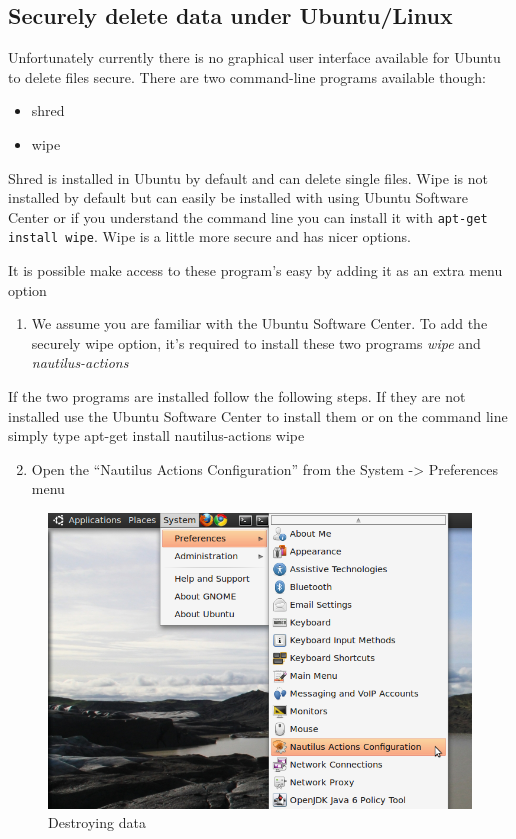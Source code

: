\subsection{Securely delete data under Ubuntu/Linux}

Unfortunately currently there is no graphical user interface available
for Ubuntu to delete files secure. There are two command-line programs
available though:

\begin{itemize}
\item
  shred
\item
  wipe
\end{itemize}
Shred is installed in Ubuntu by default and can delete single files.
Wipe is not installed by default but can easily be installed with using
Ubuntu Software Center or if you understand the command line you can
install it with \verb!apt-get install wipe!. Wipe is a little more
secure and has nicer options.

It is possible make access to these program's easy by adding it as an
extra menu option

\begin{enumerate}[1.]
\item
  We assume you are familiar with the Ubuntu Software Center. To add the
  securely wipe option, it's required to install these two programs
  \emph{wipe} and \emph{nautilus-actions}
\end{enumerate}
If the two programs are installed follow the following steps. If they
are not installed use the Ubuntu Software Center to install them or on
the command line simply type apt-get install nautilus-actions wipe

\begin{enumerate}[1.]
\setcounter{enumi}{1}
\item
  Open the ``Nautilus Actions Configuration'' from the System
  -\textgreater{} Preferences menu
\end{enumerate}
\begin{figure}[htbp]
\centering
\includegraphics{destroy_data_009.png}
\caption{Destroying data}
\end{figure}

